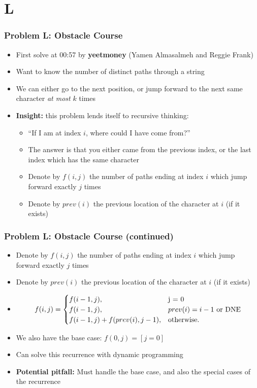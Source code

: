 \section{L}%
\label{sec:l}

\begin{frame}
  \frametitle{Problem L: Obstacle Course}

  \begin{itemize}
    \item First solve at 00:57 by \textbf{yeetmoney} (Yamen Almasalmeh and Reggie Frank)
    \item Want to know the number of distinct paths through a string
    \item We can either go to the next position, or jump forward to the next
      same character \textit{at most} $k$ times
    \item \textbf{Insight:} this problem lends itself to recursive thinking:
      \begin{itemize}
        \item ``If I am at index $i$, where could I have come from?''
        \item The answer is that you either came from the previous index, or the last index which has the same character
        \item Denote by $f(i, j)$ the number of paths ending at index $i$ which jump forward exactly $j$ times
        \item Denote by $prev(i)$ the previous location of the character at $i$ (if it exists)
      \end{itemize}
  \end{itemize}

\end{frame}

\begin{frame}
  \frametitle{Problem L: Obstacle Course (continued)}
  \begin{itemize}
    \item Denote by $f(i, j)$ the number of paths ending at index $i$ which jump forward exactly $j$ times
    \item Denote by $prev(i)$ the previous location of the character at $i$ (if it exists)
    \item \[
        f(i, j) = \begin{cases}
          f(i-1, j), & $j = 0$\\
          f(i-1, j), & \text{$prev(i)=i-1$ or DNE}\\
          f(i-1, j) + f(prev(i), j-1), & \text{otherwise.}
        \end{cases}
      \]
    \item We also have the base case: $f(0, j) = [j=0]$
    \item Can solve this recurrence with dynamic programming
    \item \textbf{Potential pitfall:} Must handle the base case, and also the special cases of the recurrence
  \end{itemize}
\end{frame}

